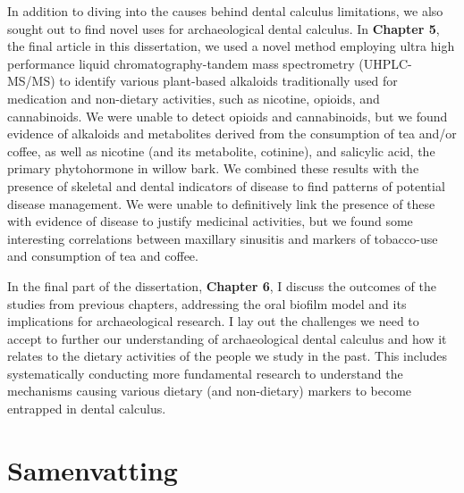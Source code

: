 \documentclass[
  letterpaper,
]{book}
\begin{document}
In addition to diving into the causes behind dental calculus
limitations, we also sought out to find novel uses for archaeological
dental calculus. In \textbf{Chapter 5}, the final article in this
dissertation, we used a novel method employing ultra high performance
liquid chromatography-tandem mass spectrometry (UHPLC-MS/MS) to identify
various plant-based alkaloids traditionally used for medication and
non-dietary activities, such as nicotine, opioids, and cannabinoids. We
were unable to detect opioids and cannabinoids, but we found evidence of
alkaloids and metabolites derived from the consumption of tea and/or
coffee, as well as nicotine (and its metabolite, cotinine), and
salicylic acid, the primary phytohormone in willow bark. We combined
these results with the presence of skeletal and dental indicators of
disease to find patterns of potential disease management. We were unable
to definitively link the presence of these with evidence of disease to
justify medicinal activities, but we found some interesting correlations
between maxillary sinusitis and markers of tobacco-use and consumption
of tea and coffee.

In the final part of the dissertation, \textbf{Chapter 6}, I discuss the
outcomes of the studies from previous chapters, addressing the oral
biofilm model and its implications for archaeological research. I lay
out the challenges we need to accept to further our understanding of
archaeological dental calculus and how it relates to the dietary
activities of the people we study in the past. This includes
systematically conducting more fundamental research to understand the
mechanisms causing various dietary (and non-dietary) markers to become
entrapped in dental calculus.

\hypertarget{samenvatting}{%
\chapter*{Samenvatting}\label{samenvatting}}

\end{document}
